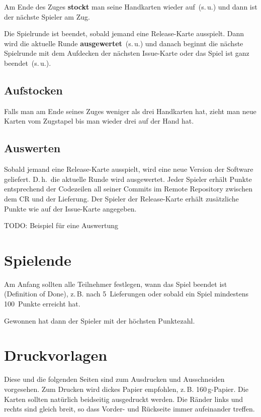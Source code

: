 \documentclass[DIV=15, fontsize=11pt]{scrartcl}
\newcommand\textrule[1]{\textbf{#1}}
\begin{document}
Am Ende des Zuges \textrule{stockt} man seine Handkarten wieder auf~(s.\,u.) und dann ist der nächste Spieler am Zug.

Die Spielrunde ist beendet, sobald jemand eine Release-Karte ausspielt. Dann wird die aktuelle Runde \textrule{ausgewertet}~(s.\,u.) und danach beginnt die nächste Spielrunde mit dem Aufdecken der nächsten Issue-Karte oder das Spiel ist ganz beendet~(s.\,u.).


\subsection{Aufstocken}
Falls man am Ende seines Zuges weniger als drei Handkarten hat, zieht man neue Karten vom Zugstapel bis man wieder drei auf der Hand hat.


\subsection{Auswerten}
Sobald jemand eine Release-Karte ausspielt, wird eine neue Version der Software geliefert. D.\,h.\ die aktuelle Runde wird ausgewertet. Jeder Spieler erhält Punkte entsprechend der Codezeilen all seiner Commits im Remote Repository zwischen dem CR und der Lieferung. Der Spieler der Release-Karte erhält zusätzliche Punkte wie auf der Issue-Karte angegeben.

TODO: Beispiel für eine Auswertung



\section{Spielende}
Am Anfang sollten alle Teilnehmer festlegen, wann das Spiel beendet ist (Definition of Done), z.\,B. nach 5~Lieferungen oder sobald ein Spiel mindestens 100~Punkte erreicht hat.

Gewonnen hat dann der Spieler mit der höchsten Punktezahl.



\clearpage
\section{Druckvorlagen}
Diese und die folgenden Seiten sind zum Ausdrucken und Ausschneiden vorgesehen. Zum Drucken wird dickes Papier empfohlen, z.\,B. 160\,g-Papier. Die Karten sollten natürlich beidseitig ausgedruckt werden. Die Ränder links und rechts sind gleich breit, so dass Vorder- und Rückseite immer aufeinander treffen.
\end{document}
